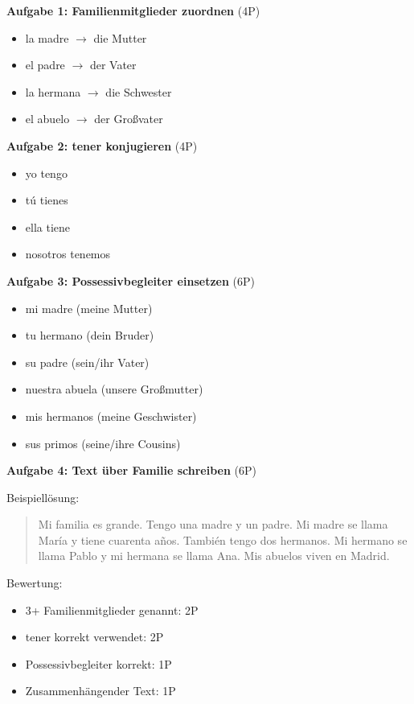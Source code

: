 \documentclass[11pt,a4paper]{article}
\begin{document}
\textbf{Aufgabe 1: Familienmitglieder zuordnen} (4P)
\begin{itemize}
    \item la madre $\rightarrow$ die Mutter
    \item el padre $\rightarrow$ der Vater
    \item la hermana $\rightarrow$ die Schwester
    \item el abuelo $\rightarrow$ der Großvater
\end{itemize}

\textbf{Aufgabe 2: tener konjugieren} (4P)
\begin{itemize}
    \item yo tengo
    \item tú tienes
    \item ella tiene
    \item nosotros tenemos
\end{itemize}

\textbf{Aufgabe 3: Possessivbegleiter einsetzen} (6P)
\begin{itemize}
    \item mi madre (meine Mutter)
    \item tu hermano (dein Bruder)
    \item su padre (sein/ihr Vater)
    \item nuestra abuela (unsere Großmutter)
    \item mis hermanos (meine Geschwister)
    \item sus primos (seine/ihre Cousins)
\end{itemize}

\textbf{Aufgabe 4: Text über Familie schreiben} (6P)

Beispiellösung:
\begin{quote}
Mi familia es grande. Tengo una madre y un padre. Mi madre se llama María y tiene cuarenta años. También tengo dos hermanos. Mi hermano se llama Pablo y mi hermana se llama Ana. Mis abuelos viven en Madrid.
\end{quote}

Bewertung:
\begin{itemize}
    \item 3+ Familienmitglieder genannt: 2P
    \item tener korrekt verwendet: 2P
    \item Possessivbegleiter korrekt: 1P
    \item Zusammenhängender Text: 1P
\end{itemize}
\end{document}
